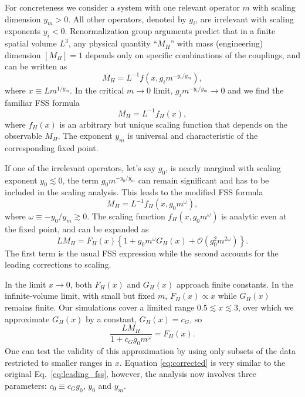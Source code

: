 \documentclass[aps,prl,twocolumn,]{revtex4-1}  %
\newcommand{\cO}{\ensuremath{\mathcal O} }
\newcommand{\lsim}{\ensuremath{\lesssim} }
\newcommand{\eq}[1]{Eq.~\ref{#1}}
\begin{document}
For concreteness we consider a system with one relevant operator $m$ with scaling dimension $y_m > 0$.
All other operators, denoted by $g_i$, are irrelevant with scaling exponents $y_i < 0$.
Renormalization group arguments predict that in a finite spatial volume $L^3$, any physical quantity ``$M_H$'' with mass (engineering) dimension $[M_H] = 1$ depends only on specific combinations of the couplings, and can be written as
\begin{equation}
  \label{eq:general}
  M_H = L^{-1} f\left(x, g_i m^{-y_i / y_m}\right),
\end{equation}
where $x \equiv L m^{1 / y_m}$.
In the critical $m\to 0$ limit, $g_i m^{-y_i / y_m} \to 0$ and we find the familiar FSS formula
\begin{equation}
\label{eq:leading_fss}
  M_H = L^{-1} f_H(x),
\end{equation}
where $f_H(x)$ is an arbitrary but unique scaling function that
depends on the observable $M_H$. The exponent $y_m$  is universal and characteristic of the corresponding fixed point.

If one of the irrelevant operators, let's say $g_0$, is nearly marginal with scaling exponent $y_0 \lsim 0$, the term $g_0 m^{-y_0 / y_m}$ can remain significant and has to be included in the scaling analysis.
This leads to the modified FSS formula
\begin{equation}
  M_H = L^{-1} f_H\left(x, g_0 m^{\omega}\right),
\end{equation}
where $\omega \equiv -y_0 / y_m \gtrsim 0$.
The scaling function $f_H\left(x, g_0 m^{\omega}\right)$ is analytic even at the fixed point, and can be expanded as
\begin{equation}
  \label{eq:expansion}
  L M_H = F_H(x)\left\{1 + g_0 m^{\omega} G_H(x) + \cO\left(g_0^2 m^{2\omega}\right)\right\}.
\end{equation}
The first term is the usual FSS expression while the second  accounts for the leading corrections to scaling.



In the limit $x \to 0$, both $F_H(x)$ and $G_H(x)$ approach finite constants.
In the infinite-volume limit, with small but fixed $m$, $F_H(x)\propto x$ while $G_H(x)$ remains finite.
Our simulations cover a limited range $0.5 \lsim x \lsim 3$, over which we approximate $G_H(x)$ by a constant, $G_H(x) = c_G$, so 
\begin{equation}
  \label{eq:corrected}
  \frac{L M_H}{1 + c_G g_0 m^{\omega}} = F_H(x).
\end{equation}
One can test the validity of this approximation by  using only subsets of the data restricted to smaller ranges in $x$.
Equation \ref{eq:corrected} is very similar to the original \eq{eq:leading_fss}, 
however, the analysis now involves three parameters: $c_0 \equiv c_G g_0$, $y_0$ and $y_m$.
\end{document}
